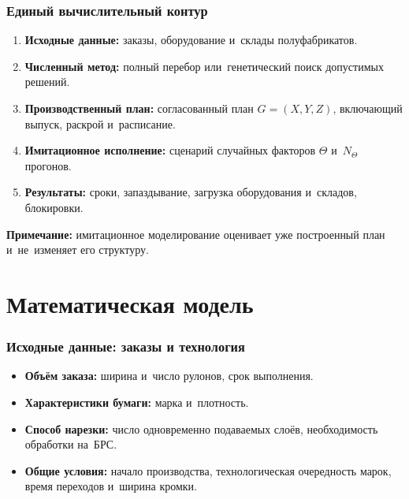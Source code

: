 \begin{frame}
    \frametitle{Единый вычислительный контур}
    \large
    \begin{enumerate}
        \item \textbf{Исходные данные:} заказы, оборудование и~склады
        полуфабрикатов.
        \item \textbf{Численный метод:} полный перебор или~генетический
        поиск допустимых решений.
        \item \textbf{Производственный план:} согласованный план
        $G=(X,Y,Z)$, включающий выпуск, раскрой и~расписание.
        \item \textbf{Имитационное исполнение:} сценарий случайных
        факторов $\Theta$ и~$N_\Theta$ прогонов.
        \item \textbf{Результаты:} сроки, запаздывание, загрузка
        оборудования и~складов, блокировки.
    \end{enumerate}

    \vspace{0.2cm}
    \textbf{Примечание:} имитационное моделирование оценивает уже построенный план и~не~изменяет его структуру.
\end{frame}

\section{Математическая модель}

\begin{frame}
    \frametitle{Исходные данные: заказы и технология}
    \large
    \begin{itemize}
        \item \textbf{Объём заказа:} ширина и~число рулонов, срок выполнения.
        \item \textbf{Характеристики бумаги:} марка и~плотность.
        \item \textbf{Способ нарезки:} число одновременно подаваемых слоёв, необходимость обработки на~БРС.
        \item \textbf{Общие условия:} начало производства, технологическая очередность марок, время переходов и~ширина кромки.
    \end{itemize}
    \vspace{0.3cm}
\end{frame}

